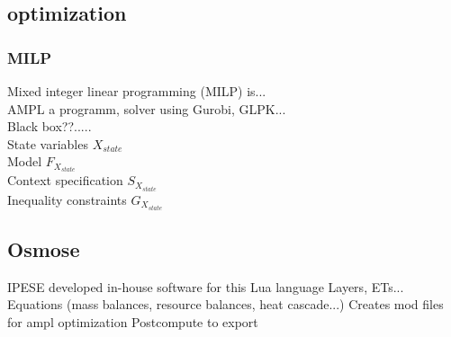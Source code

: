 \documentclass{article}
\begin{document}
 

\subsection{optimization}

\subsubsection{MILP}
Mixed integer linear programming (MILP) is... \\
AMPL a programm, solver using Gurobi, GLPK...\\
Black box??.....\\
State variables $X_{state}$\\
Model $F_{X_{state}}$\\
Context specification $S_{X_{state}}$\\
Inequality constraints $G_{X_{state}}$\\


%
%


\subsection{Osmose}\label{ss:osmose}
IPESE developed in-house software for this
Lua language
Layers, ETs...
Equations (mass balances, resource balances, heat cascade...)
Creates mod files for ampl optimization
Postcompute to export
\end{document}
